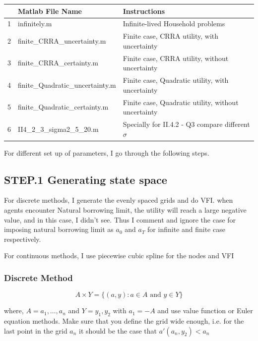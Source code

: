 \documentclass{article}[a4paper]
\begin{document}
\begin{table}[]
\centering
\begin{tabular}{@{}lll@{}}
\toprule
  & Matlab File Name                 & Instructions                                        \\ \midrule
1 & infinitely.m                     & Infinite-lived Household problems                   \\
2 & finite\_CRRA\_uncertainty.m      & Finite case, CRRA utility, with uncertainty         \\
3 & finite\_CRRA\_certainty.m        & Finite case, CRRA utility, without uncertainty      \\
4 & finite\_Quadratic\_uncertainty.m & Finite case, Quadratic utility, with uncertainty    \\
5 & finite\_Quadratic\_certainty.m   & Finite case, Quadratic utility, without uncertainty \\ 
6 & II4\_2\_3\_sigma2\_5\_20.m            & Specially for II.4.2 - Q3 compare different $\sigma$\\ \bottomrule
\end{tabular}
\end{table}

For different set up of parameters, I go through the following steps.

\subsection{STEP.1 Generating state space}

For discrete methods, I generate the evenly spaced grids and do VFI. when agents encounter Natural borrowing limit, the utility will reach a large negative value, and in this case, I didn't see. Thus I comment and ignore the case for imposing natural borrowing limit as $a_0$ and $a_T$ for infinite and finite case respectively.

For continuous methods, I use piecewise cubic spline for the nodes and VFI
\subsubsection{Discrete Method}
\[ A \times Y = \{ (a,y): a\in A \text{ and } y\in Y  \}\]

where, $A={a_1, \dots, a_n}$ and $Y = {y_1, y_2}$ with $a_1 = -A$ and use value function or Euler equation methods. Make sure that you define the grid wide enough, i.e. for the last point in the grid $a_n$ it should be the case that $a'(a_n, y_2)<a_n$
\end{document}
